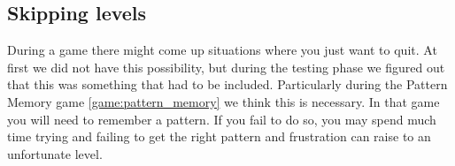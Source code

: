 \subsection{Skipping levels}
During a game there might come up situations where you just want to quit. At
first we did not have this possibility, but during the testing phase we figured
out that this was something that had to be included. Particularly during the
Pattern Memory game \ref{game:pattern_memory} we think this is necessary. In
that game you will need to remember a pattern. If you fail to do so, you may
spend much time trying and failing to get the right pattern and frustration can
raise to an unfortunate level. 


